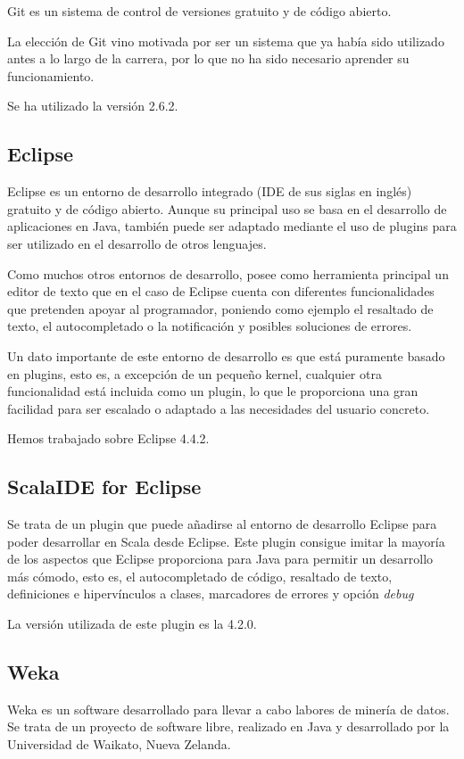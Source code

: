 Git es un sistema de control de versiones gratuito y de código abierto.

La elección de Git vino motivada por ser un sistema que ya había sido utilizado antes a lo largo de la carrera, por lo que no ha sido necesario aprender su funcionamiento.

Se ha utilizado la versión 2.6.2.


\subsection{Eclipse}
Eclipse es un entorno de desarrollo integrado (IDE de sus siglas en inglés) gratuito y de código abierto. Aunque su principal uso se basa en el desarrollo de aplicaciones en Java, también puede ser adaptado mediante el uso de plugins para ser utilizado en el desarrollo de otros lenguajes.

Como muchos otros entornos de desarrollo, posee como herramienta principal un editor de texto que en el caso de Eclipse cuenta con diferentes funcionalidades que pretenden apoyar al programador, poniendo como ejemplo el resaltado de texto, el autocompletado o la notificación y posibles soluciones de errores.

Un dato importante de este entorno de desarrollo es que está puramente basado en plugins, esto es, a excepción de un pequeño kernel, cualquier otra funcionalidad está incluida como un plugin, lo que le proporciona una gran facilidad para ser escalado o adaptado a las necesidades del usuario concreto.

Hemos trabajado sobre Eclipse 4.4.2.

\subsection{ScalaIDE for Eclipse}

Se trata de un plugin que puede añadirse al entorno de desarrollo Eclipse para poder desarrollar en Scala desde Eclipse.
Este plugin consigue imitar la mayoría de los aspectos que Eclipse proporciona para Java para permitir un desarrollo más cómodo, esto es, el autocompletado de código, resaltado de texto, definiciones e hipervínculos a clases, marcadores de errores y opción \textit{debug}

La versión utilizada de este plugin es la 4.2.0.


\subsection{Weka}\label{sec:DefWeka}
Weka es un software desarrollado para llevar a cabo labores de minería de datos. Se trata de un proyecto de software libre, realizado en Java y desarrollado por la Universidad de Waikato, Nueva Zelanda.

